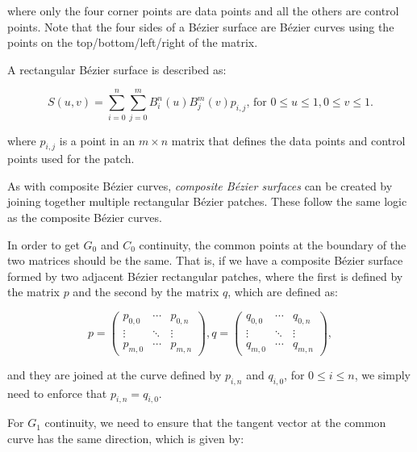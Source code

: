 where only the four corner points are data points and all the others are control points.
Note that the four sides of a B\'ezier surface are B\'ezier curves using the points on the top/bottom/left/right of the matrix.

A rectangular B\'ezier surface is described as:

\begin{equation}
\label{eq:bezierrectangle}
S(u, v) = \sum_{i=0}^n \sum_{j=0}^m B^n_i(u) B^m_j(v) p_{i,j}\text{, for }0 \leq u \leq 1, 0 \leq v \leq 1.
\end{equation}

where \(p_{i,j}\) is a point in an \(m \times n\) matrix that defines the data points and control points used for the patch.

As with composite B\'ezier curves, \emph{composite B\'ezier surfaces} can be created by joining together multiple rectangular B\'ezier patches.
These follow the same logic as the composite B\'ezier curves.

In order to get \(G_0\) and \(C_0\) continuity, the common points at the boundary of the two matrices should be the same.
That is, if we have a composite B\'ezier surface formed by two adjacent B\'ezier rectangular patches, where the first is defined by the matrix \(p\) and the second by the matrix \(q\), which are defined as:

\begin{equation}
p = \left(\begin{array}{ccc}
p_{0,0} & \cdots & p_{0,n} \\
\vdots & \ddots & \vdots \\
p_{m,0} & \cdots & p_{m,n} 
\end{array}\right),
q = \left(\begin{array}{ccc}
q_{0,0} & \cdots & q_{0,n} \\
\vdots & \ddots & \vdots \\
q_{m,0} & \cdots & q_{m,n} 
\end{array}\right),
\end{equation}

and they are joined at the curve defined by \(p_{i,n}\) and \(q_{i,0}\), for \(0 \leq i \leq n\), we simply need to enforce that \(p_{i,n} = q_{i, 0}\).

For \(G_1\) continuity, we need to ensure that the tangent vector at the common curve has the same direction, which is given by:

